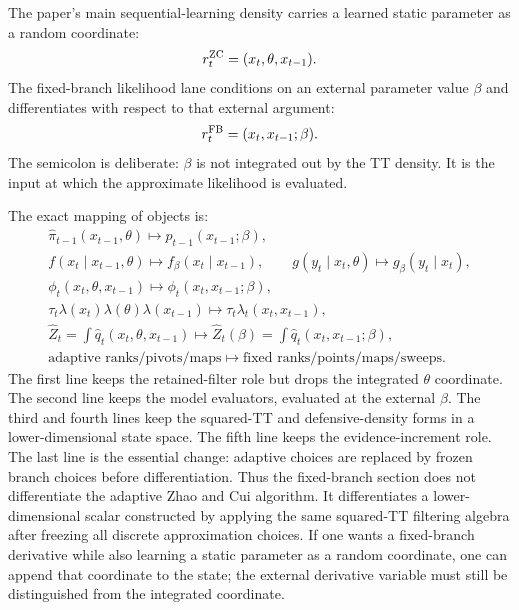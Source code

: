 \documentclass[11pt]{article}
\numberwithin{equation}{section}
\begin{document}
The paper's main sequential-learning density carries a learned static
parameter as a random coordinate:
\begin{equation}
    r_t^{\rm ZC}=(x_t,\theta,x_{t-1}).
    \label{eq:p24-r1}
\end{equation}
The fixed-branch likelihood lane conditions on an external parameter value
\(\beta\) and differentiates with respect to that external argument:
\begin{equation}
    r_t^{\rm FB}=(x_t,x_{t-1};\beta).
    \label{eq:p24-r2}
\end{equation}
The semicolon is deliberate: \(\beta\) is not integrated out by the TT density.
It is the input at which the approximate likelihood is evaluated.

The exact mapping of objects is:
\begin{equation}
\begin{gathered}
\widehat\pi_{t-1}(x_{t-1},\theta)
\mapsto
\widehat p_{t-1}(x_{t-1};\beta),\\
f(x_t\mid x_{t-1},\theta)\mapsto f_\beta(x_t\mid x_{t-1}),
\qquad
g(y_t\mid x_t,\theta)\mapsto g_\beta(y_t\mid x_t),\\
\phi_t(x_t,\theta,x_{t-1})
\mapsto
\phi_t(x_t,x_{t-1};\beta),\\
\tau_t\lambda(x_t)\lambda(\theta)\lambda(x_{t-1})
\mapsto
\tau_t\lambda_t(x_t,x_{t-1}),\\
\widehat Z_t
=
\int\widehat q_t(x_t,\theta,x_{t-1})
\mapsto
\widehat Z_t(\beta)
=
\int\widehat q_t(x_t,x_{t-1};\beta),\\
\text{adaptive ranks/pivots/maps}
\mapsto
\text{fixed ranks/points/maps/sweeps}.
\end{gathered}
\label{eq:p24-r3}
\end{equation}
The first line keeps the retained-filter role but drops the integrated
\(\theta\) coordinate.  The second line keeps the model evaluators, evaluated at
the external \(\beta\).  The third and fourth lines keep the squared-TT and
defensive-density forms in a lower-dimensional state space.  The fifth line
keeps the evidence-increment role.  The last line is the essential change:
adaptive choices are replaced by frozen branch choices before differentiation.
Thus the fixed-branch section does not differentiate the adaptive Zhao and Cui \cite{zhao2024ttsequential}
algorithm.  It differentiates a lower-dimensional scalar constructed by applying
the same squared-TT filtering algebra after freezing all discrete approximation
choices.  If one wants a fixed-branch derivative while also learning a static
parameter as a random coordinate, one can append that coordinate to the state;
the external derivative variable must still be distinguished from the
integrated coordinate.
\end{document}
